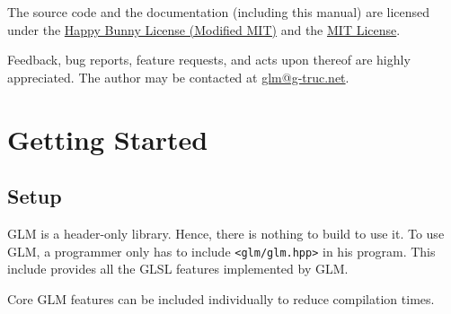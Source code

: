 \documentclass{scrartcl}
\numberwithin{figure}{subsection}
\begin{document}
The source code and the documentation (including this manual) are licensed under the \hyperlink{happybunny}{Happy Bunny License (Modified MIT)} and the \hyperlink{mit}{MIT License}.

Feedback, bug reports, feature requests, and acts upon thereof are highly appreciated.  The author may be contacted at \href{mailto://glm@g-truc.net}{glm@g-truc.net}.


\section{Getting Started}
\subsection{Setup}
GLM is a header-only library. Hence, there is nothing to build to use it. To use GLM, a programmer only has to include \verb|<glm/glm.hpp>| in his program. This include provides all the GLSL features implemented by GLM.

Core GLM features can be included individually to reduce compilation times.
\end{document}
